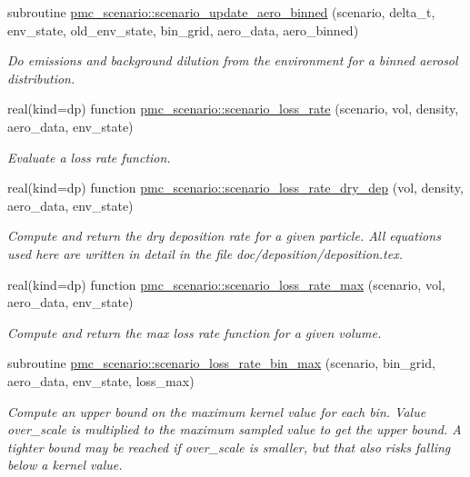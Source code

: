 \begin{DoxyCompactItemize}
subroutine \mbox{\hyperlink{namespacepmc__scenario_aa8ca6c77c94665bdbf4c4f25e2dd1523}{pmc\+\_\+scenario\+::scenario\+\_\+update\+\_\+aero\+\_\+binned}} (scenario, delta\+\_\+t, env\+\_\+state, old\+\_\+env\+\_\+state, bin\+\_\+grid, aero\+\_\+data, aero\+\_\+binned)
\begin{DoxyCompactList}\small\item\em Do emissions and background dilution from the environment for a binned aerosol distribution. \end{DoxyCompactList}\item 
real(kind=dp) function \mbox{\hyperlink{namespacepmc__scenario_ab60e2eeb66ae8849ad11923d76a9bd7f}{pmc\+\_\+scenario\+::scenario\+\_\+loss\+\_\+rate}} (scenario, vol, density, aero\+\_\+data, env\+\_\+state)
\begin{DoxyCompactList}\small\item\em Evaluate a loss rate function. \end{DoxyCompactList}\item 
real(kind=dp) function \mbox{\hyperlink{namespacepmc__scenario_adbc0c60c8638d7bc02416577dedf89ac}{pmc\+\_\+scenario\+::scenario\+\_\+loss\+\_\+rate\+\_\+dry\+\_\+dep}} (vol, density, aero\+\_\+data, env\+\_\+state)
\begin{DoxyCompactList}\small\item\em Compute and return the dry deposition rate for a given particle. All equations used here are written in detail in the file {\ttfamily doc/deposition/deposition.\+tex}. \end{DoxyCompactList}\item 
real(kind=dp) function \mbox{\hyperlink{namespacepmc__scenario_a3b3b510051adbe1f82741b50ea7d5857}{pmc\+\_\+scenario\+::scenario\+\_\+loss\+\_\+rate\+\_\+max}} (scenario, vol, aero\+\_\+data, env\+\_\+state)
\begin{DoxyCompactList}\small\item\em Compute and return the max loss rate function for a given volume. \end{DoxyCompactList}\item 
subroutine \mbox{\hyperlink{namespacepmc__scenario_a5b6292cb3c74aba853700581ea964bc0}{pmc\+\_\+scenario\+::scenario\+\_\+loss\+\_\+rate\+\_\+bin\+\_\+max}} (scenario, bin\+\_\+grid, aero\+\_\+data, env\+\_\+state, loss\+\_\+max)
\begin{DoxyCompactList}\small\item\em Compute an upper bound on the maximum kernel value for each bin. Value over\+\_\+scale is multiplied to the maximum sampled value to get the upper bound. A tighter bound may be reached if over\+\_\+scale is smaller, but that also risks falling below a kernel value. \end{DoxyCompactList}\item 

\end{DoxyCompactItemize}

